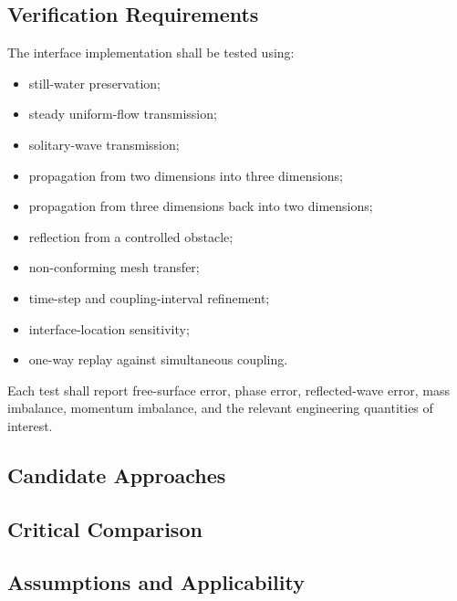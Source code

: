 \subsection{Verification Requirements}
\label{sec:res-num-ibc-verification-requirements}


The interface implementation shall be tested using:
\begin{itemize}
  \item still-water preservation;
  \item steady uniform-flow transmission;
  \item solitary-wave transmission;
  \item propagation from two dimensions into three dimensions;
  \item propagation from three dimensions back into two dimensions;
  \item reflection from a controlled obstacle;
  \item non-conforming mesh transfer;
  \item time-step and coupling-interval refinement;
  \item interface-location sensitivity;
  \item one-way replay against simultaneous coupling.
\end{itemize}
Each test shall report free-surface error, phase error, reflected-wave error, mass imbalance, momentum imbalance, and the relevant engineering quantities of interest.

\subsection{Candidate Approaches}
\label{sec:res-num-ibc-candidate-approaches}


\subsection{Critical Comparison}
\label{sec:res-num-ibc-critical-comparison}


\subsection{Assumptions and Applicability}
\label{sec:res-num-ibc-assumptions}

